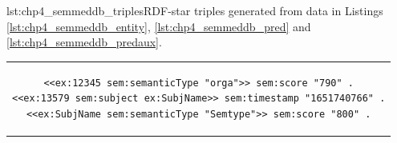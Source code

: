 \noindent\hspace{0.1\linewidth}\begin{minipage}{0.78\linewidth}
\begin{captionedlisting}{lst:chp4_semmeddb_triples}{RDF-star triples generated from data in Listings \ref{lst:chp4_semmeddb_entity}, \ref{lst:chp4_semmeddb_pred} and \ref{lst:chp4_semmeddb_predaux}.}
\centering
\begin{tabular}{c}
\hspace{-1.5em}
{
\begin{lstlisting}[basicstyle=\ttfamily\small,label={list:example1},columns=flexible]
<<ex:12345 sem:semanticType "orga">> sem:score "790" .
<<ex:13579 sem:subject ex:SubjName>> sem:timestamp "1651740766" .
<<ex:SubjName sem:semanticType "Semtype">> sem:score "800" .
\end{lstlisting}
}
\end{tabular}
\end{captionedlisting}
\end{minipage}
